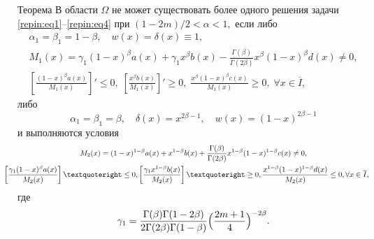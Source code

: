 \begin{newthm}{Теорема} В области $\Omega$ не может существовать более одного решения задачи \eqref{repin:eq1}--\eqref{repin:eq4} при $({1-2m})/{2}< \alpha<1,$ если либо
\begin{gather}
       \label{repin:eq5}
\alpha_{1}=\beta_{1}=1-\beta, \quad  w(x)=\delta(x) \equiv 1,
\\
       \label{repin:eq8}
M_{1}(x)=\gamma_{1}(1-x)^{\beta} a(x)+\gamma_{1}x^{\beta} b(x)-\frac{\Gamma(\beta)}{\Gamma(2\beta)} x^{\beta} (1-x)^{\beta}d(x) \ne 0,
\\
       \label{repin:eq8}
\left[ \frac{(1-x)^{\beta} a(x)}{M_{1}(x)} \right]' \leq 0, 
\;
\left[ \frac{x^{\beta} b(x)}{M_{1}(x)} \right]' \geq 0, 
\; 
\frac{x^{\beta}(1-x)^{\beta} c(x)}{M_{1}(x)} \geq 0, 
\;
\forall x \in \overline I,
 \end{gather}
либо
\begin{equation}
       \label{repin:eq8}
\alpha_{1}=\beta_{1}=\beta, \quad \delta(x) =x^{2\beta-1}, \quad w(x)=(1-x)^{2\beta-1}
\end{equation}
и выполняются условия
\begin{gather}
       \label{repin:eq10}
M_{2}(x)=(1-x)^{1-\beta} a(x)+x^{1-\beta} b(x)+\frac{\Gamma(\beta)}{\Gamma(2\beta)} x^{1-\beta} (1-x)^{1-\beta}c(x) \ne 0,
\\
       \label{repin:eq10}
       \!\!\!\!\!\! \hspace{-3mm}
\left[ \frac{\gamma_{1}(1-x)^{\beta} a(x)}{M_{2}(x)} \right]’ \leq 0,  
\left[ \frac{\gamma_{1} x^{1-\beta} b(x)}{M_{2}(x)} \right]’ \geq 0, 
\frac{x^{1-\beta}(1-x)^{1-\beta} d(x)}{M_{2}(x)} \leq 0,  \forall x \in \overline I,
 \end{gather}
где
\[
\gamma_{1}=\frac{\Gamma(\beta) \Gamma(1-2\beta)}{2\Gamma(2 \beta) \Gamma(1-\beta)} \Bigl( \frac{2m+1}{4}\Bigr)^{-2\beta}.
\]
\end{newthm}

\smallskip

